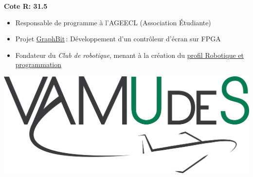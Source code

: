 \documentclass[10pt,a4paper,withhyper]{altacv}
\begin{document}
\begin{paracol}{2}
\divider

\vspace{46pt}
\hfill\begin{minipage}{2cm}
    \textbf{\color{heading}\small Cote R: 31.5}
\end{minipage}
\vspace{-56pt}

\begin{itemize}
    \item Responsable de programme à l'AGEECL (Association Étudiante)
    \item Projet \href{https://github.com/graphbit/GraphBit-V1}{GraphBit}\,: Développement d'un contrôleur d'écran sur FPGA
\end{itemize}

\newpage
{}
\begin{itemize}
    \item Fondateur du \textit{Club de robotique}, menant à la création du \href{https://collegegarnier.qc.ca/programmes/11-profils/robotique/}{profil Robotique et programmation}
\end{itemize}




\end{paracol}



\hfill\begin{minipage}{2.5cm}
    \includegraphics[width=\linewidth]{figures/vamudes.pdf}
\end{minipage}
\vspace{-1cm}
\end{document}
